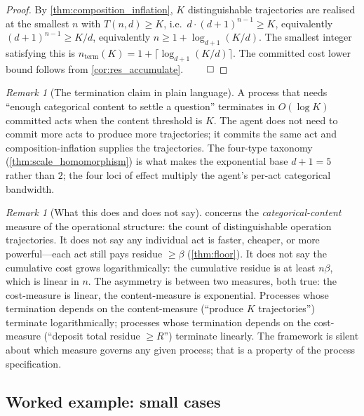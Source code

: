 \documentclass[11pt,twocolumn,a4paper]{article}
\theoremstyle{thmstyle}
\theoremstyle{definition}
\theoremstyle{remark}
\newtheorem{remark}[theorem]{Remark}
\newcommand{\floor}{\beta}
\begin{document}
\begin{proof}
By \cref{thm:composition_inflation}, $K$ distinguishable
trajectories are realised at the smallest $n$ with
$T(n, d) \geq K$, i.e.~$d \cdot (d+1)^{n-1} \geq K$, equivalently
$(d+1)^{n-1} \geq K/d$, equivalently
$n \geq 1 + \log_{d+1}(K/d)$. The smallest integer satisfying this
is $n_{\mathrm{term}}(K) = 1 + \lceil \log_{d+1}(K/d) \rceil$. The
committed cost lower bound follows from
\cref{cor:res_accumulate}. $\qed$
\end{proof}

\begin{remark}[The termination claim in plain language]
\label{rem:termination_plain}
A process that needs ``enough categorical content to settle a
question'' terminates in $O(\log K)$ committed acts when the
content threshold is $K$. The agent does not need to commit more
acts to produce more trajectories; it commits the same act and
composition-inflation supplies the trajectories. The four-type
taxonomy (\cref{thm:scale_homomorphism}) is what makes the
exponential base $d + 1 = 5$ rather than $2$; the four loci of
effect multiply the agent's per-act categorical bandwidth.
\end{remark}

\begin{remark}[What this does and does not say]
\label{rem:inflation_scope}
 concerns the
\emph{categorical-content} measure of the operational structure: the
count of distinguishable operation trajectories. It does not say
any individual act is faster, cheaper, or more powerful---each act
still pays residue $\geq \floor$ (\cref{thm:floor}). It does not
say the cumulative cost grows logarithmically: the cumulative
residue is at least $n \floor$, which is linear in $n$. The
asymmetry is between two measures, both true: the cost-measure is
linear, the content-measure is exponential. Processes whose
termination depends on the content-measure (``produce $K$
trajectories'') terminate logarithmically; processes whose
termination depends on the cost-measure (``deposit total residue
$\geq R$'') terminate linearly. The framework is silent about which
measure governs any given process; that is a property of the
process specification.
\end{remark}

\subsection{Worked example: small cases}
\end{document}
